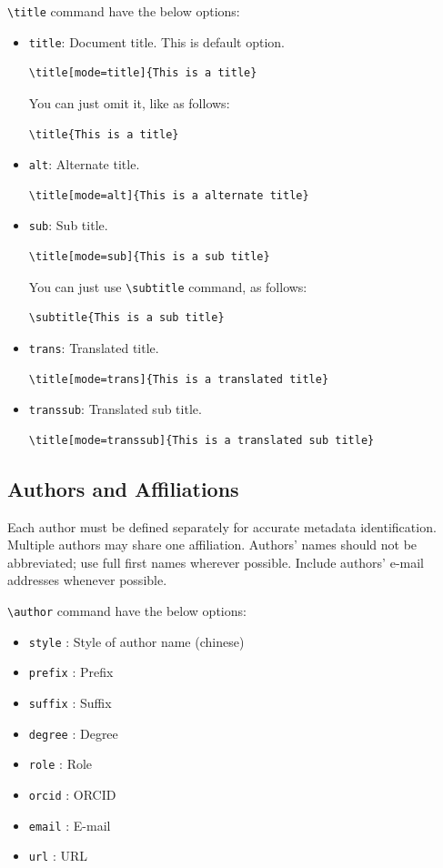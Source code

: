 \documentclass[
]{ceurart}
\begin{document}
\verb|\title| command have the below options:
\begin{itemize}
\item \verb|title|: Document title. This is default option. 
\begin{lstlisting}
\title[mode=title]{This is a title}
\end{lstlisting}
You can just omit it, like as follows:
\begin{lstlisting}
\title{This is a title}
\end{lstlisting}

\item \verb|alt|: Alternate title.
\begin{lstlisting}
\title[mode=alt]{This is a alternate title}
\end{lstlisting}

\item \verb|sub|: Sub title.
\begin{lstlisting}
\title[mode=sub]{This is a sub title}
\end{lstlisting}
You can just use \verb|\subtitle| command, as follows:
\begin{lstlisting}
\subtitle{This is a sub title}
\end{lstlisting}

\item \verb|trans|: Translated title.
\begin{lstlisting}
\title[mode=trans]{This is a translated title}
\end{lstlisting}

\item \verb|transsub|: Translated sub title.
\begin{lstlisting}
\title[mode=transsub]{This is a translated sub title}
\end{lstlisting}
\end{itemize}

\subsection{Authors and Affiliations}

Each author must be defined separately for accurate metadata
identification. Multiple authors may share one affiliation. Authors'
names should not be abbreviated; use full first names wherever
possible. Include authors' e-mail addresses whenever possible.

\verb|\author| command have the below options: 

\begin{itemize}
\item \verb|style| : Style of author name (chinese)
\item \verb|prefix| : Prefix
\item \verb|suffix| : Suffix
\item \verb|degree| : Degree
\item \verb|role| : Role
\item \verb|orcid| : ORCID
\item \verb|email| : E-mail
\item \verb|url| : URL
\end{itemize}
\end{document}
